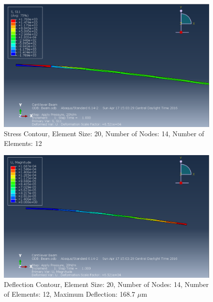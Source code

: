 \documentclass[a4paper]{article}
\begin{document}
\begin{figure}[ht]
\centering
\includegraphics[scale=.50]{3Nsize20stress.PNG}
\caption{Stress Contour, Element Size: 20, Number of Nodes: 14, Number of Elements: 12}
\end{figure}
\begin{figure}[ht]
\centering
\includegraphics[scale=.50]{3Nsize20MDisplacement.PNG}
\caption{Deflection Contour, Element Size: 20, Number of Nodes: 14, Number of Elements: 12, Maximum Deflection: 168.7 $\mu$m}
\end{figure}
\end{document}
